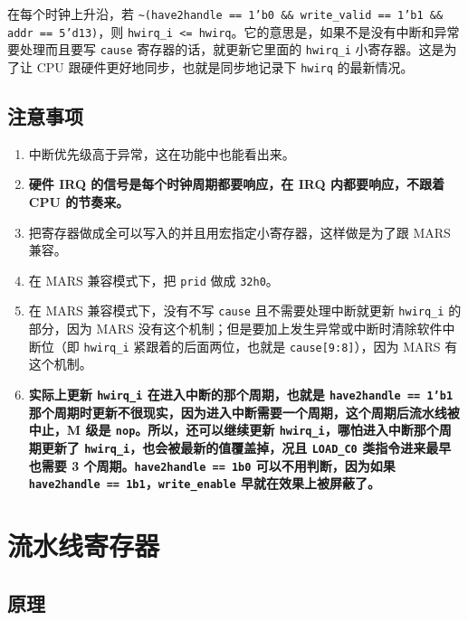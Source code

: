 \documentclass[12pt,AutoFakeBold,AutoFakeSlant]{article}
\providecommand{\tightlist}{%
  \setlength{\itemsep}{0pt}\setlength{\parskip}{0pt}}
\newcommand{\ms}[1]{\texttt{#1}}
\begin{document}
在每个时钟上升沿，若 \ms{\~{}(have2handle == 1'b0 \&\& write\_valid == 1'b1 \&\& addr == 5'd13)}，则 \texttt{hwirq\_i\ \textless{}=\ hwirq}。它的意思是，如果不是没有中断和异常要处理而且要写 \ms{cause} 寄存器的话，就更新它里面的 \ms{hwirq\_i} 小寄存器。这是为了让 CPU 跟硬件更好地同步，也就是同步地记录下 \ms{hwirq} 的最新情况。

\hypertarget{ux6ce8ux610fux4e8bux9879-8}{%
\subsection{注意事项}\label{ux6ce8ux610fux4e8bux9879-8}}

\begin{enumerate}
\def\labelenumi{\arabic{enumi}.}
\tightlist
\item
  中断优先级高于异常，这在功能中也能看出来。
\item
  \textbf{硬件 IRQ 的信号是每个时钟周期都要响应，在 IRQ 内都要响应，不跟着 CPU 的节奏来。}
\item
  把寄存器做成全可以写入的并且用宏指定小寄存器，这样做是为了跟 MARS 兼容。
\item
  在 MARS 兼容模式下，把 \texttt{prid} 做成 \texttt{32\textquotesingle{}h0}。
\item
  在 MARS 兼容模式下，没有不写 \texttt{cause} 且不需要处理中断就更新 \ms{hwirq\_i} 的部分，因为 MARS 没有这个机制；但是要加上发生异常或中断时清除软件中断位（即 \texttt{hwirq\_i} 紧跟着的后面两位，也就是 \ms{cause[9:8]}），因为 MARS 有这个机制。
\item
  \textbf{实际上更新 \texttt{hwirq\_i}
  在进入中断的那个周期，也就是 \ms{have2handle == 1'b1} 那个周期时更新不很现实，因为进入中断需要一个周期，这个周期后流水线被中止，M 级是 \ms{nop}。所以，还可以继续更新 \texttt{hwirq\_i}，哪怕进入中断那个周期更新了 \ms{hwirq\_i}，也会被最新的值覆盖掉，况且 \ms{LOAD\_C0} 类指令进来最早也需要 3 个周期。\texttt{have2handle\ ==\ 1\textquotesingle{}b0}
  可以不用判断，因为如果
  \texttt{have2handle\ ==\ 1\textquotesingle{}b1}，\texttt{write\_enable}
  早就在效果上被屏蔽了。}
\end{enumerate}

\hypertarget{ux6d41ux6c34ux7ebfux5bc4ux5b58ux5668}{%
\section{流水线寄存器}\label{ux6d41ux6c34ux7ebfux5bc4ux5b58ux5668}}

\hypertarget{ux539fux7406-11}{%
\subsection{原理}\label{ux539fux7406-11}}
\end{document}
